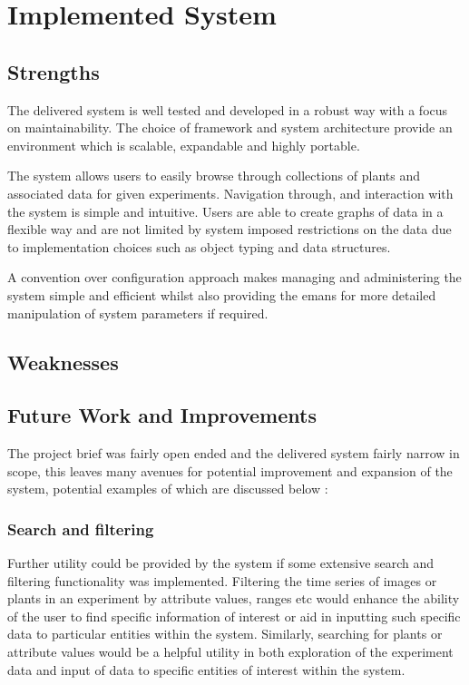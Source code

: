 \section{Implemented System}
\subsection{Strengths}
The delivered system is well tested and developed in a robust way with a focus on maintainability. The choice of framework and system architecture provide an environment which is scalable, expandable and highly portable.

The system allows users to easily browse through collections of plants and associated data for given experiments. Navigation through, and interaction with the system is simple and intuitive. Users are able to create graphs of data in a flexible way and are not limited by system imposed restrictions on the data due to implementation choices such as object typing and data structures.

A convention over configuration approach makes managing and administering the system simple and efficient whilst also providing the emans for more detailed manipulation of system parameters if required. 

\subsection{Weaknesses}





\subsection{Future Work and Improvements}

The project brief was fairly open ended and the delivered system fairly narrow in scope, this leaves many avenues for potential improvement and expansion of the system, potential examples of which are discussed  below :

\subsubsection{Search and filtering}
Further utility could be provided by the system if some extensive search and filtering functionality was implemented. Filtering the time series of images or plants in an experiment by attribute values, ranges etc would enhance the ability of the user to find specific information of interest or aid in inputting such specific data to particular entities within the system. Similarly, searching for plants or attribute values would be a helpful utility in both exploration of the experiment data and input of data to specific entities of interest within the system.

